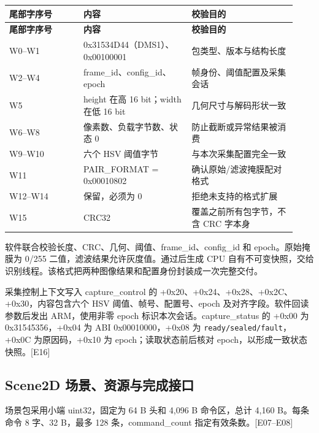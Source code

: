 {\small\renewcommand{\arraystretch}{1.28}
\begin{longtable}{@{}>{\raggedright\arraybackslash}p{0.24\linewidth}>{\raggedright\arraybackslash}p{0.35\linewidth}>{\raggedright\arraybackslash}p{0.34\linewidth}@{}}
\toprule
\bfseries 尾部字序号 & \bfseries 内容 & \bfseries 校验目的\\\midrule
\endfirsthead
\toprule
\bfseries 尾部字序号 & \bfseries 内容 & \bfseries 校验目的\\\midrule
\endhead
\bottomrule\endfoot
W0–W1 & 0x31534D44（DMS1）、0x00100001 & 包类型、版本与结构长度\\
W2–W4 & frame\_id、config\_id、epoch & 帧身份、阈值配置及采集会话\\
W5 & height 在高 16 bit；width 在低 16 bit & 几何尺寸与解码形状一致\\
W6–W8 & 像素数、负载字节数、状态 0 & 防止截断或异常结果被消费\\
W9–W10 & 六个 HSV 阈值字节 & 与本次采集配置完全一致\\
W11 & PAIR\_FORMAT = 0x00010802 & 确认原始/滤波掩膜配对格式\\
W12–W14 & 保留，必须为 0 & 拒绝未支持的格式扩展\\
W15 & CRC32 & 覆盖之前所有包字节，不含 CRC 字本身\\
\end{longtable}}
软件联合校验长度、CRC、几何、阈值、frame\_id、config\_id 和 epoch。原始掩膜为 0/255 二值，滤波结果允许灰度值。通过后生成 CPU 自有不可变快照，交给识别线程。该格式把两种图像结果和配置身份封装成一次完整交付。

采集控制上下文写入 capture\_control 的 +0x20、+0x24、+0x28、+0x2C、+0x30，内容包含六个 HSV 阈值、帧号、配置号、epoch 及对齐字段。软件回读参数后发出 ARM，使用非零 epoch 标识本次会话。capture\_status 的 +0x00 为 0x31545356，+0x04 为 ABI 0x00010000，+0x08 为 \nolinkurl{ready/sealed/fault}，+0x0C 为原因码，+0x10 为 epoch；读取状态前后核对 epoch，以形成一致状态快照。[E16]

\subsection{Scene2D 场景、资源与完成接口}
场景包采用小端 uint32，固定为 64 B 头和 4,096 B 命令区，总计 4,160 B。每条命令 8 字、32 B，最多 128 条，command\_count 指定有效条数。[E07–E08]

